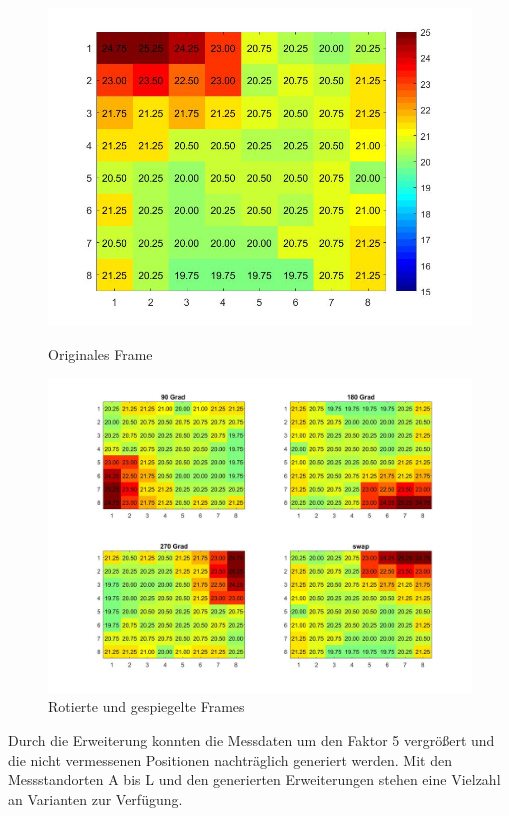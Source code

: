 \begin{figure}[!ht]
	\centering
	\begin{minipage}[c]{0.35\linewidth}
	\centering
	\includegraphics[width=.8\linewidth]{fig/original}
	\caption[Originales Frame]{Originales Frame}
	\label{fig:original}
	\end{minipage}
	\hfill
	\begin{minipage}[c]{0.6\linewidth  }
\includegraphics[width=1\linewidth]{fig/rotated}
\caption[Rotierte und gespiegelte Frames]{Rotierte und gespiegelte Frames}
\label{fig:rotated}
	\end{minipage}
\end{figure}


Durch die Erweiterung konnten die Messdaten um den Faktor 5 vergrößert und die nicht vermessenen Positionen nachträglich generiert werden. Mit den Messstandorten A bis L und den generierten Erweiterungen stehen eine Vielzahl an Varianten zur Verfügung. 


